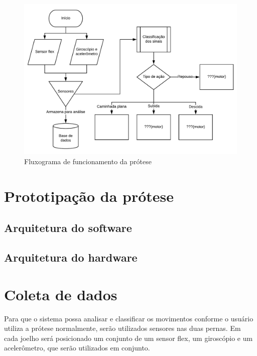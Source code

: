 \begin{figure}[h]
	\caption{\label{fig:flowchart}Fluxograma de funcionamento da prótese}
	\begin{center}
	    \includegraphics[width=\textwidth]{resources/flowchart}
	\end{center}
\end{figure}

\section{Prototipação da prótese}

\subsection{Arquitetura do software}

\subsection{Arquitetura do hardware}

\section{Coleta de dados}
Para que o sistema possa analisar e classificar os movimentos conforme o usuário utiliza a prótese normalmente, serão utilizados sensores nas duas pernas. Em cada joelho será posicionado um conjunto de um sensor flex, um giroscópio e um acelerômetro, que serão utilizados em conjunto.

